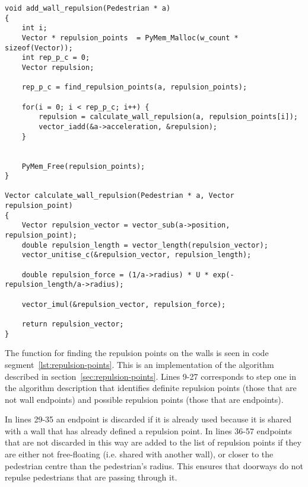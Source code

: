 \begin{lstlisting}[caption={Calculating the repulsion from the 
    walls.},label=lst:wall-repulsion]
void add_wall_repulsion(Pedestrian * a)
{
    int i;
    Vector * repulsion_points  = PyMem_Malloc(w_count * sizeof(Vector));
    int rep_p_c = 0;
    Vector repulsion;

    rep_p_c = find_repulsion_points(a, repulsion_points);

    for(i = 0; i < rep_p_c; i++) {
        repulsion = calculate_wall_repulsion(a, repulsion_points[i]);
        vector_iadd(&a->acceleration, &repulsion);
    }


    PyMem_Free(repulsion_points);
}

Vector calculate_wall_repulsion(Pedestrian * a, Vector repulsion_point)
{
    Vector repulsion_vector = vector_sub(a->position, repulsion_point);
    double repulsion_length = vector_length(repulsion_vector);
    vector_unitise_c(&repulsion_vector, repulsion_length);

    double repulsion_force = (1/a->radius) * U * exp(-repulsion_length/a->radius);

    vector_imul(&repulsion_vector, repulsion_force);

    return repulsion_vector;
}
\end{lstlisting}

The function for finding the repulsion points on the walls is seen in code 
segment~\ref{lst:repulsion-points}. This is an implementation of the algorithm 
described in section~\ref{sec:repulsion-points}. Lines 9-27 corresponds to 
step one in the algorithm description that identifies definite repulsion 
points (those that are not wall endpoints) and possible repulsion points 
(those that are endpoints).

In lines 29-35 an endpoint is discarded if it is already used because it is 
shared with a wall that has already defined a repulsion point. In lines 36-57 
endpoints that are not discarded in this way are added to the list of 
repulsion points if they are either not free-floating (i.e. shared with 
another wall), or closer to the pedestrian centre than the pedestrian's 
radius. This ensures that doorways do not repulse pedestrians that are passing 
through it.

